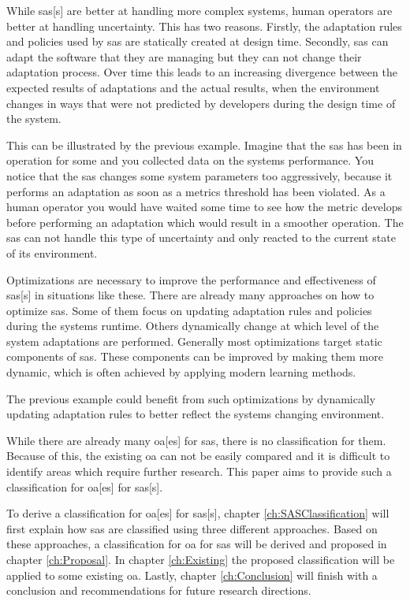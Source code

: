 \noindent While \acrlong{sas}[s] are better at handling more complex systems,
human operators are better at handling uncertainty.
This has two reasons. 
Firstly, the adaptation rules and policies used by \acrshort{sas} are statically created at design time.
Secondly, \acrshort{sas} can adapt the software that they are managing but they can not change their adaptation process.
Over time this leads to an increasing divergence between the expected results of adaptations and the actual results,
when the environment changes in ways that were not predicted by developers during the design time of the system.

\noindent This can be illustrated by the previous example.
Imagine that the \acrlong{sas} has been in operation for some and you collected data on the systems performance.
You notice that the \acrshort{sas} changes some system parameters too aggressively,
because it performs an adaptation as soon as a metrics threshold has been violated.
As a human operator you would have waited some time to see how the metric develops before performing an adaptation
which would result in a smoother operation.
The \acrshort{sas} can not handle this type of uncertainty and only reacted to the current state of its environment.

\noindent Optimizations are necessary to improve the performance and effectiveness of \acrlong{sas}[s] in situations like these.
There are already many approaches on how to optimize \acrshort{sas}.
Some of them focus on updating adaptation rules and policies during the systems runtime.
Others dynamically change at which level of the system adaptations are performed.
Generally most optimizations target static components of \acrshort{sas}.
These components can be improved by making them more dynamic, 
which is often achieved by applying modern learning methods.

\noindent The previous example could benefit from such optimizations by dynamically updating adaptation rules
to better reflect the systems changing environment.

\noindent While there are already many \acrfull{oa}[es] for \acrshort{sas},
there is no classification for them.
Because of this, the existing \acrshort{oa} can not be easily compared
and it is difficult to identify areas which require further research.
This paper aims to provide such a classification for \acrlong{oa}[es] for \acrlong{sas}[s].

\noindent To derive a classification for \acrlong{oa}[es] for \acrlong{sas}[s],
chapter \ref{ch:SASClassification} will first explain how \acrshort{sas} are classified
using three different approaches.
Based on these approaches, a classification for \acrshort{oa} for \acrshort{sas} will be derived
and proposed in chapter \ref{ch:Proposal}.
In chapter \ref{ch:Existing} the proposed classification will be applied to some existing \acrshort{oa}.
Lastly, chapter \ref{ch:Conclusion} will finish with a conclusion and recommendations for future research directions.
